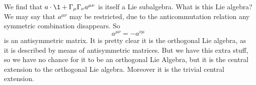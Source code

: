 We find that $a\cdot\1+\Gamma_{\mu}\Gamma_{\nu}a^{\mu\nu}$ is
itself a Lie subalgebra. What is this Lie algebra? We may say
that $a^{\mu\nu}$ may be restricted, due to the anticommutation
relation any symmetric combination disappears. So
\begin{equation}
a^{\mu\nu}=-a^{\nu\mu}
\end{equation}
is an antisymmetric matrix. It is pretty clear it is the
orthogonal Lie algebra, as it is described by means of
antisymmetric matrices. But we have this extra stuff, so we have
no chance for it to be an orthogonal Lie Algebra, but it is the
central extension to the orthogonal Lie algebra. Moreover it is
the trivial central extension.
